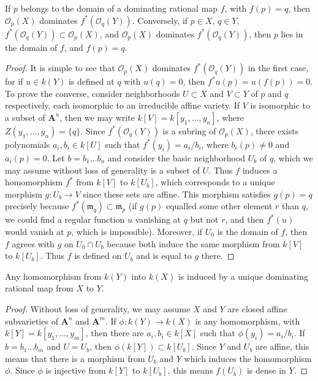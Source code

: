 \begin{theorem}
    If $p$ belongs to the domain of a dominating rational map $f$, with $f(p) = q$, then $\mathcal{O}_p(X)$ dominates $f^*(\mathcal{O}_q(Y))$. Conversely, if $p \in X$, $q \in Y$, $f^*(\mathcal{O}_q(Y)) \subset \mathcal{O}_p(X)$, and $\mathcal{O}_p(X)$ dominates $f^*(\mathcal{O}_q(Y))$, then $p$ lies in the domain of $f$, and $f(p) = q$.
\end{theorem}
\begin{proof}
    It is simple to see that $\mathcal{O}_p(X)$ dominates $f^*(\mathcal{O}_q(Y))$ in the first case, for if $u \in k(Y)$ is defined at $q$ with $u(q) = 0$, then $f^*u(p) = u(f(p)) = 0$. To prove the converse, consider neighborhoods $U \subset X$ and $V \subset Y$ of $p$ and $q$ respectively, each isomorphic to an irreducible affine variety. If $V$ is isomorphic to a subset of $\mathbf{A}^n$, then we may write $k[V] = k[y_1,\dots,y_n]$, where $Z(y_1,\dots,y_n) = \{ q \}$. Since $f^*(\mathcal{O}_q(Y))$ is a subring of $\mathcal{O}_p(X)$, there exists polynomials $a_i,b_i \in k[U]$ such that $f^*(y_i) = a_i/b_i$, where $b_i(p) \neq 0$ and $a_i(p) = 0$. Let $b = b_1 \dots b_n$ and consider the basic neighborhood $U_b$ of $q$, which we may assume without loss of generality is a subset of $U$. Thus $f$ induces a homomorphism $f^*$ from $k[V]$ to $k[U_b]$, which corresponds to a unique morphism $g: U_b \to V$ since these sets are affine. This morphism satisfies $g(p) = q$ precisely because $f^*(\mathfrak{m}_q) \subset \mathfrak{m}_p$ (if $g(p)$ equalled some other element $r$ than $q$, we could find a regular function $u$ vanishing at $q$ but not $r$, and then $f^*(u)$ would vanish at $p$, which is impossible). Moreover, if $U_0$ is the domain of $f$, then $f$ agrees with $g$ on $U_0 \cap U_b$ because both induce the same morphism from $k[V]$ to $k[U_b]$. Thus $f$ is defined on $U_b$ and is equal to $g$ there.
\end{proof}

\begin{theorem}
    Any homomorphism from $k(Y)$ into $k(X)$ is induced by a unique dominating rational map from $X$ to $Y$.
\end{theorem}
\begin{proof}
    Without loss of generality, we may assume $X$ and $Y$ are closed affine subvarieties of $\mathbf{A}^n$ and $\mathbf{A}^m$. If $\phi: k(Y) \to k(X)$ is any homomorphism, with $k[Y] = k[y_1,\dots,y_m]$, then there are $a_i,b_i \in k[X]$ such that $\phi(y_i) = a_i/b_i$. If $b = b_1 \dots b_m$ and $U = U_b$, then $\phi(k[Y]) \subset k[U_b]$. Since $Y$ and $U_b$ are affine, this means that there is a morphism from $U_b$ and $Y$ which induces the homomorphism $\phi$. Since $\phi$ is injective from $k[Y]$ to $k[U_b]$, this means $f(U_b)$ is dense in $Y$.
\end{proof}

